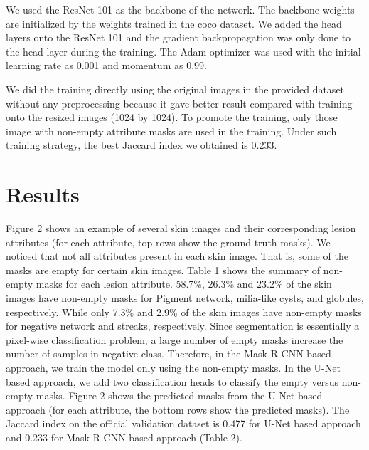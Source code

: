 \documentclass{article}
\begin{document}
We used the ResNet 101 as the backbone of the network. The backbone weights are initialized by the weights trained in the coco dataset. We added the head layers onto the ResNet 101 and the gradient backpropagation was only done to the head layer during the training. The Adam optimizer was used with the initial learning rate as 0.001 and momentum as 0.99.

We did the training directly using the original images in the provided dataset without any preprocessing because it gave better result compared with training onto the resized images (1024 by 1024). To promote the training, only those image with non-empty attribute masks are used in the training. Under such training strategy, the best Jaccard index we obtained is 0.233.

\section{Results}
Figure 2 shows an example of several skin images and their corresponding lesion attributes (for each attribute, top rows show the ground truth masks).  We noticed that not all attributes present in each skin image. That is, some of the masks are empty for certain skin images. Table 1 shows the summary of non-empty masks for each lesion attribute. 58.7\%, 26.3\% and 23.2\% of the skin images have non-empty masks for Pigment network, milia-like cysts, and globules, respectively.  While only 7.3\% and 2.9\% of the skin images have non-empty masks for negative network and streaks, respectively. Since segmentation is essentially a pixel-wise classification problem, a large number of empty masks increase the number of samples in negative class. Therefore, in the Mask R-CNN based approach, we train the model only using the non-empty masks. In the U-Net based approach, we add two classification heads to classify the empty versus non-empty masks. Figure 2 shows the predicted masks from the U-Net based approach (for each attribute, the bottom rows show the predicted masks). The Jaccard index on the official validation dataset is 0.477 for U-Net based approach and 0.233 for Mask R-CNN based approach (Table 2). 


\end{document}
